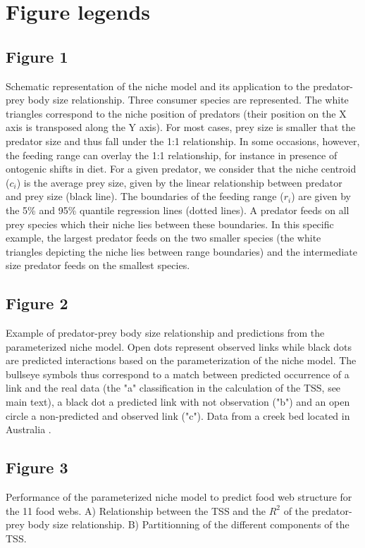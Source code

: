 \documentclass[12pt]{article}
\begin{document}
\printbibliography
\newpage

\section*{Figure legends}

\subsection*{Figure 1} 
Schematic representation of the niche model and its
application to the predator-prey body size relationship. Three consumer species
are represented. The white triangles correspond to the niche position of
predators (their position on the X axis is transposed along the Y axis). For
most cases, prey size is smaller that the predator size and thus fall under the
1:1 relationship. In some occasions, however, the feeding range can overlay the
1:1 relationship, for instance in presence of ontogenic shifts in diet. For a
given predator, we consider that the niche centroid ($c_i$) is the average prey
size, given by the linear relationship between predator and prey size (black
line). The boundaries of the feeding range ($r_i$) are given by the 5\% and 95\%
quantile regression lines (dotted lines). A predator feeds on all prey species
which their niche lies between these boundaries. In this specific example, the
largest predator feeds on the two smaller species (the white triangles depicting
the niche lies between range boundaries) and the intermediate size predator
feeds on the smallest species.

\subsection*{Figure 2} 
Example of predator-prey body size relationship and
predictions from the parameterized niche model. Open dots represent observed
links while black dots are predicted interactions based on the parameterization
of the niche model. The bullseye symbols thus correspond to a match between
predicted occurrence of a link and the real data (the "a" classification in the
calculation of the TSS, see main text), a black dot a predicted link with not
observation ("b") and an open circle a non-predicted and observed link ("c").
Data from a creek bed located in Australia \parencite{Brose2005}.

\subsection*{Figure 3} 
Performance of the parameterized niche model to predict
food web structure for the 11 food webs. A) Relationship between the TSS and the
$R^2$ of the predator-prey body size relationship. B) Partitionning of the
different components of the TSS.
\end{document}
